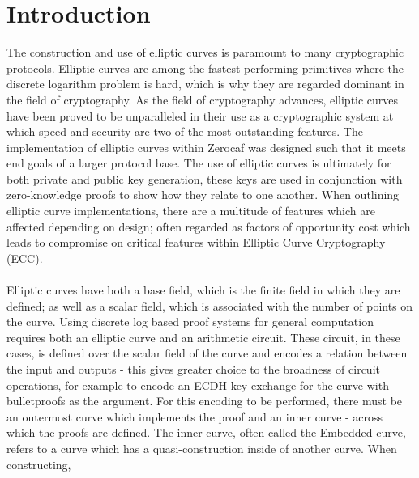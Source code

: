 \documentclass{article}
\begin{document}
\section{Introduction}
The construction and use of elliptic curves is paramount to many cryptographic protocols. Elliptic curves are among the fastest performing primitives where the discrete logarithm problem is hard, which is why they are regarded dominant in the field of cryptography. As the field of cryptography advances, elliptic curves have been proved to be unparalleled in their use as a cryptographic system at which speed and security are two of the most outstanding features. The implementation of elliptic curves within Zerocaf was designed such that it meets end goals of a larger protocol base. The use of elliptic curves is ultimately for both private and public key generation, these keys are used in conjunction with zero-knowledge proofs to show how they relate to one another. When outlining elliptic curve implementations, there are a multitude of features which are affected depending on design; often regarded as factors of opportunity cost which leads to compromise on critical features within Elliptic Curve Cryptography (ECC).\\\\
Elliptic curves have both a base field, which is the finite field in which they are defined; as well as a scalar field, which is associated with the number of points on the curve. Using discrete log based proof systems for general computation requires both an elliptic curve and an arithmetic circuit. These circuit, in these cases, is defined over the scalar field of the curve and encodes a relation between the input and outputs - this gives greater choice to the broadness of circuit operations, for example to encode an ECDH key exchange for the curve with bulletproofs as the argument. For this encoding to be performed, there must be an outermost curve which implements the proof and an inner curve - across which the proofs are defined. The inner curve, often called the Embedded curve, refers to a curve which has a quasi-construction inside of another curve. When constructing,  \\\\
\end{document}
